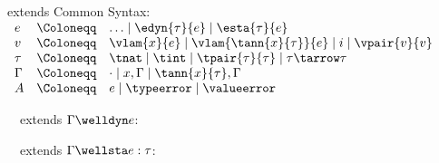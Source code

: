 \begin{flushleft}

 extends Common Syntax:\\
$\begin{array}{l c l}
  e & \Coloneqq & \ldots \mid \edyn{\tau}{e} \mid \esta{\tau}{e}
\\
  v & \Coloneqq & \vlam{x}{e} \mid \vlam{\tann{x}{\tau}}{e} \mid i \mid \vpair{v}{v}
\\
  \tau & \Coloneqq & \tnat \mid \tint \mid \tpair{\tau}{\tau} \mid \tau \tarrow \tau
\\
  \Gamma & \Coloneqq & \cdot \mid x,\Gamma \mid \tann{x}{\tau},\Gamma
\\
  A & \Coloneqq & e \mid \typeerror \mid \valueerror
\end{array}$

\medskip
\begin{minipage}[t]{0.5\columnwidth}
~~extends $\Gamma \welldyn e$:\\
\begin{mathpar}

\end{mathpar}
\end{minipage}%
\begin{minipage}[t]{0.5\columnwidth}
~~extends $\Gamma \wellsta e : \tau$:\\
\begin{mathpar}


\end{mathpar}
\end{minipage}
\end{flushleft}
